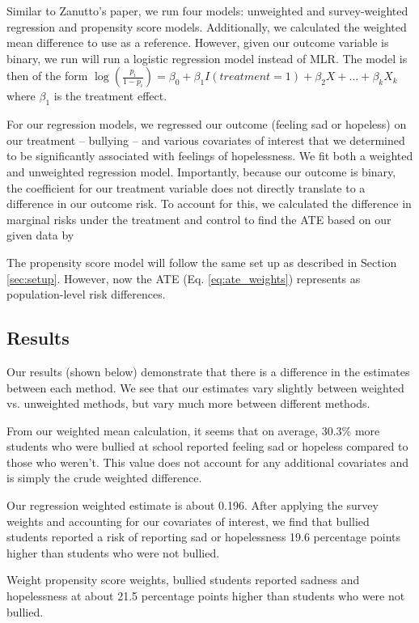 \documentclass[12pt]{article}
\begin{document}
Similar to Zanutto's paper, we run four models: unweighted and survey-weighted regression and propensity score models. Additionally, we calculated the weighted mean difference to use as a reference. However, given our outcome variable is binary, we run will run a logistic regression model instead of MLR. The model is then of the form $\log(\frac{p_i}{1-p_i}) = \beta_0 + \beta_1I(treatment = 1) + \beta_2X + ... + \beta_kX_k$ where $\beta_1$ is the treatment effect. 

For our regression models, we regressed our outcome (feeling sad or hopeless) on our treatment -- bullying -- and various covariates of interest that we determined to be significantly associated with feelings of hopelessness. We fit both a weighted and unweighted regression model. Importantly, because our outcome is binary, the coefficient for our treatment variable does not directly translate to a difference in our outcome risk. To account for this, we calculated the difference in marginal risks under the treatment and control to find the ATE based on our given data by 

The propensity score model will follow the same set up as described in Section \ref{sec:setup}. However, now the ATE (Eq. \ref{eq:ate_weights}) represents as population-level risk differences.


\subsection{Results} \label{subex:ExtResults}

Our results (shown below) demonstrate that there is a difference in the estimates between each method. We see that our estimates vary slightly between weighted vs. unweighted methods, but vary much more between different methods.



From our weighted mean calculation, it seems that on average, 30.3\% more students who were bullied at school reported feeling sad or hopeless compared to those who weren't. This value does not account for any additional covariates and is simply the crude weighted difference.

Our regression weighted estimate is about 0.196. After applying the survey weights and accounting for our covariates of interest, we find that bullied students reported a risk of reporting sad or hopelessness 19.6 percentage points higher than students who were not bullied.

Weight propensity score weights, bullied students reported sadness and hopelessness at about 21.5 percentage points higher than students who were not bullied.
\end{document}
